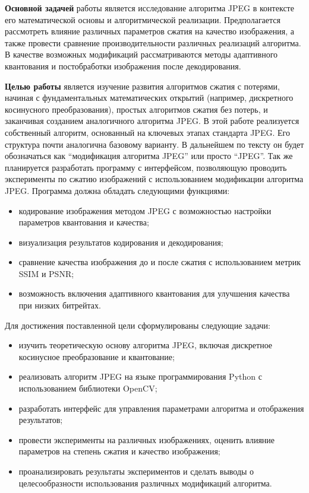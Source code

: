 \vspace{1em}

\textbf{Основной задачей} работы является исследование алгоритма JPEG в контексте его математической основы и алгоритмической реализации. 
Предполагается рассмотреть влияние различных параметров сжатия на качество изображения, а также провести сравнение производительности различных реализаций алгоритма. 
В качестве возможных модификаций рассматриваются методы адаптивного квантования и постобработки изображения после декодирования.

\vspace{1em}
\textbf{Целью работы} является изучение развития алгоритмов сжатия с потерями, начиная с фундаментальных математических открытий (например, дискретного косинусного преобразования), простых алгоритмов сжатия без потерь, и заканчивая созданием аналогичного алгоритма JPEG. 
В этой работе реализуется собственный алгоритм, основанный на ключевых этапах стандарта JPEG. 
Его структура почти аналогична базовому варианту. 
В дальнейшем по тексту он будет обозначаться как “модификация алгоритма JPEG” или просто “JPEG”. 
Так же планируется разработать программу с интерфейсом, позволяющую проводить эксперименты по сжатию изображений с использованием модификации алгоритма JPEG.
Программа должна обладать следующими функциями:


\begin{itemize}[label=--]
    \item кодирование изображения методом JPEG с возможностью настройки параметров квантования и качества;
    \item визуализация результатов кодирования и декодирования;
    \item сравнение качества изображения до и после сжатия с использованием метрик SSIM и PSNR;
    \item возможность включения адаптивного квантования для улучшения качества при низких битрейтах.
\end{itemize}

Для достижения поставленной цели сформулированы следующие задачи:
\begin{itemize}[label=--]
    \item изучить теоретическую основу алгоритма JPEG, включая дискретное косинусное преобразование и квантование;
    \item реализовать алгоритм JPEG на языке программирования Python с использованием библиотеки OpenCV;
    \item разработать интерфейс для управления параметрами алгоритма и отображения результатов;
    \item провести эксперименты на различных изображениях, оценить влияние параметров на степень сжатия и качество изображения;
    \item проанализировать результаты экспериментов и сделать выводы о целесообразности использования различных модификаций алгоритма.
\end{itemize}
